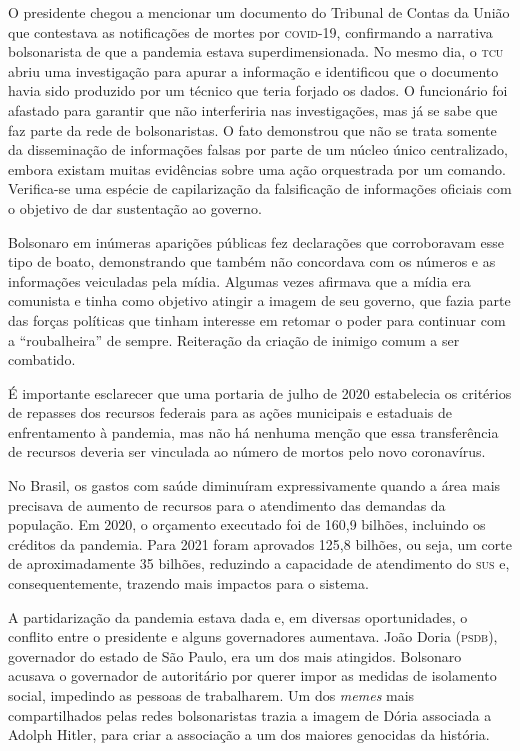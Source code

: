 O presidente chegou a mencionar um documento do Tribunal de Contas da
União que contestava as notificações de mortes por \textsc{covid-19}, confirmando
a narrativa bolsonarista de que a pandemia estava superdimensionada. No
mesmo dia, o \textsc{tcu} abriu uma investigação para apurar a informação e
identificou que o documento havia sido produzido por um técnico que
teria forjado os dados. O funcionário foi afastado para garantir que não
interferiria nas investigações, mas já se sabe que faz parte da rede de
bolsonaristas. O fato demonstrou que não se trata somente da
disseminação de informações falsas por parte de um núcleo único
centralizado, embora existam muitas evidências sobre uma ação
orquestrada por um comando. Verifica-se uma espécie de capilarização da
falsificação de informações oficiais com o objetivo de dar sustentação
ao governo.

Bolsonaro em inúmeras aparições públicas fez declarações que
corroboravam esse tipo de boato, demonstrando que também não concordava
com os números e as informações veiculadas pela mídia. Algumas vezes
afirmava que a mídia era comunista e tinha como objetivo atingir a
imagem de seu governo, que fazia parte das forças políticas que tinham
interesse em retomar o poder para continuar com a ``roubalheira'' de
sempre. Reiteração da criação de inimigo comum a ser combatido.

É importante esclarecer que uma portaria de julho de 2020 estabelecia os
critérios de repasses dos recursos federais para as ações municipais e
estaduais de enfrentamento à pandemia, mas não há nenhuma menção que
essa transferência de recursos deveria ser vinculada ao número de mortos
pelo novo coronavírus.

No Brasil, os gastos com saúde diminuíram expressivamente quando a área
mais precisava de aumento de recursos para o atendimento das demandas da
população. Em 2020, o orçamento executado foi de 160,9 bilhões,
incluindo os créditos da pandemia. Para 2021 foram aprovados 125,8
bilhões, ou seja, um corte de aproximadamente 35 bilhões, reduzindo
a capacidade de atendimento do \textsc{sus} e, consequentemente, trazendo mais
impactos para o sistema.

A partidarização da pandemia estava dada e, em diversas oportunidades, o
conflito entre o presidente e alguns governadores aumentava. João Doria
(\textsc{\textsc{psdb}}), governador do estado de São Paulo, era um dos mais atingidos.
Bolsonaro acusava o governador de autoritário por querer impor as
medidas de isolamento social, impedindo as pessoas de trabalharem. Um
dos \textit{memes} mais compartilhados pelas redes bolsonaristas trazia a imagem
de Dória associada a Adolph Hitler, para criar a associação a um dos
maiores genocidas da história.

